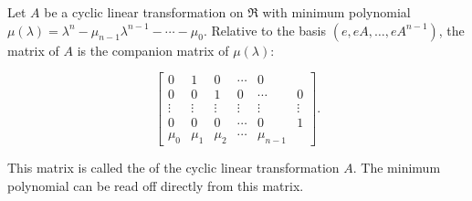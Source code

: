 Let $A$ be a cyclic linear transformation on $\Re$ with minimum polynomial $\mu(\lambda) = \lambda^n - \mu_{n-1}\lambda^{n-1} - \cdots - \mu_0$. Relative to the basis $(e, eA, \dots, eA^{n-1})$, the matrix of $A$ is the companion matrix of $\mu(\lambda)$:

$$\begin{bmatrix}
0 & 1 & 0 & \cdots & 0 \\
0 & 0 & 1 & 0 & \cdots & 0 \\
\vdots & \vdots & \vdots & \vdots & \vdots & \vdots \\
0 & 0 & 0 & \cdots & 0 & 1 \\
\mu_0 & \mu_1 & \mu_2 & \cdots & \mu_{n-1}
\end{bmatrix}.$$

This matrix is called the  of the cyclic linear transformation $A$. The minimum polynomial can be read off directly from this matrix.
